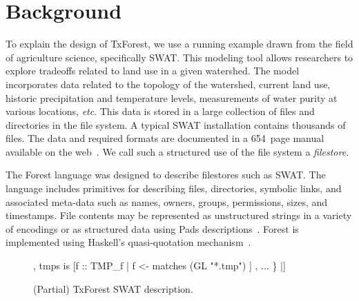 \section{Background}
\label{sec:Background}


To explain the design of TxForest, we use a running example drawn from
the field of agriculture science, specifically SWAT.  This modeling
tool allows researchers to explore tradeoffs related to land use in a
given watershed.  The model incorporates data related to the topology
of the watershed, current land use, historic precipitation and
temperature levels, measurements of water purity at various locations,
\textit{etc}.  This data is stored in a large collection of files and
directories in the file system.  A typical SWAT installation contains
thousands of files.  The data and required formats are documented in a
654~page manual available on the web~\cite{SWAT-IO-Documentation}. We
call such a structured use of the file system a \textit{filestore}.

The Forest language was designed to describe filestores such as SWAT.
The language includes primitives for describing files, directories,
symbolic links, and associated meta-data such as names, owners,
groups, permissions, sizes, and timestamps.  File contents may be
represented as unstructured strings in a variety of encodings or as
structured data using Pads
descriptions~\cite{fisher+:pads,fisher-walker:icdt}. Forest is
implemented using Haskell's quasi-quotation
mechanism~\cite{Mainland:quasi}.

\begin{figure}
\begin{code}
[txforest|
  \kw{data} Preamble\_f  = File Preamble
  data BSN\_f       = File SwatFile
  data PCP\_f       = File PCP
  data TMP\_f       = File TMP

  data Flow\_f      = File Flow                  
  data RCH\_f       = File RCH                   
  data Deviation\_f = File Deviation     
  ...                                        
  data Swat\_d = Directory 
     \{ cio \kw{is} "file.cio" :: Preamble\_f      
     , basin is <| getBasinPath cio |> :: BSN\_f          
     , pcps  is [f :: PCP\_f | f <- matches (GL "*.pcp") ] 
     , tmps  is [f :: TMP\_f | f <- matches (GL "*.tmp") ] 
     , ...
     \}
|]
\end{code}
\caption{(Partial) TxForest SWAT description. }
\label{fig:SWAT-description}
\end{figure}


